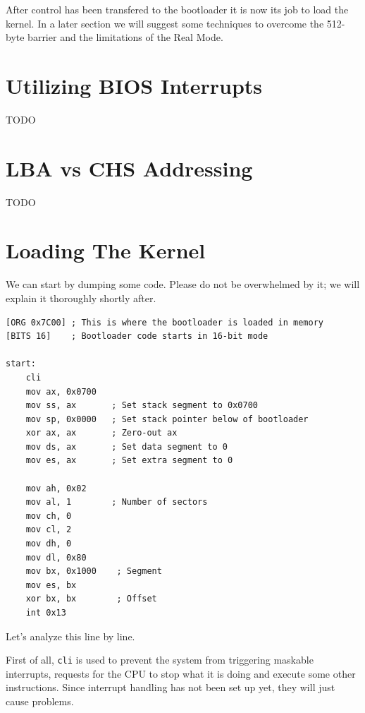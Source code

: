 
After control has been transfered to the bootloader it is now its job to load the kernel. In a later section 
we will suggest some techniques to overcome the 512-byte barrier and the limitations of the Real Mode. 

\section{Utilizing BIOS Interrupts}

TODO


\section{LBA vs CHS Addressing}

TODO

\section{Loading The Kernel}

We can start by dumping some code. Please do not be overwhelmed by it; we will explain it thoroughly shortly after.

\begin{lstlisting}[caption={Simple bootloader start in assembly}]
[ORG 0x7C00] ; This is where the bootloader is loaded in memory
[BITS 16]    ; Bootloader code starts in 16-bit mode

start:
    cli
    mov ax, 0x0700
    mov ss, ax       ; Set stack segment to 0x0700
    mov sp, 0x0000   ; Set stack pointer below of bootloader
    xor ax, ax       ; Zero-out ax
    mov ds, ax       ; Set data segment to 0
    mov es, ax       ; Set extra segment to 0

    mov ah, 0x02
    mov al, 1        ; Number of sectors
    mov ch, 0
    mov cl, 2
    mov dh, 0
    mov dl, 0x80
    mov bx, 0x1000    ; Segment
    mov es, bx
    xor bx, bx        ; Offset
    int 0x13
\end{lstlisting}
    
Let's analyze this line by line. 

First of all, \texttt{cli} is used to prevent the system from triggering maskable interrupts,
requests for the CPU to stop what it is doing and execute some other instructions.
Since interrupt handling has not been set up yet, they will just cause problems.

